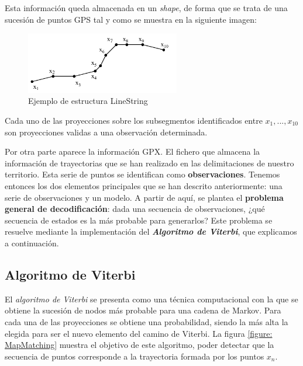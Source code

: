 Esta información queda almacenada en un \textit{shape}, de forma que se trata de una 
sucesión de puntos \ac{GPS} tal y como se muestra en la siguiente imagen:
\begin{figure}[htb]
\begin{center}
\includegraphics[width=0.6\textwidth]{./Imagenes/LineString}
\caption{Ejemplo de estructura LineString}
\label{figure: LineString}
\end{center}
\end{figure}

Cada uno de las proyecciones sobre los subsegmentos identificados entre $x_{1}, ..., 
x_{10}$ son proyecciones validas a una observación determinada.

Por otra parte aparece la información \ac{GPX}. El fichero que almacena la información 
de trayectorias que se han realizado en las delimitaciones de nuestro territorio. Esta 
serie de puntos se identifican como \textbf{observaciones}. Tenemos entonces los dos 
elementos principales que se han descrito anteriormente: una serie de observaciones y 
un modelo. A partir de aquí, se plantea el \textbf{problema general de decodificación}: 
dada una secuencia de observaciones, ¿qué secuencia de estados es la más probable 
para generarlos? Este problema se resuelve mediante la implementación del 
\textbf{\textit{Algoritmo de Viterbi}}, que explicamos a continuación.

\subsection{Algoritmo de Viterbi}
El \textit{algoritmo de Viterbi} se presenta como una técnica computacional con la que 
se obtiene la sucesión de nodos más probable para una cadena de Markov. Para cada 
una de las proyecciones se obtiene una probabilidad, siendo la más alta la elegida para 
ser el nuevo elemento del camino de Viterbi. La figura \ref{figure: MapMatching} 
muestra el objetivo de este algoritmo, poder detectar que la secuencia de puntos 
corresponde a la trayectoria formada por los puntos $x_{n}$.

